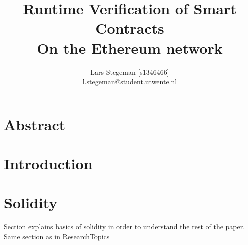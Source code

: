 \documentclass[a4paper]{article}
\title{Runtime Verification of Smart Contracts \\
\large On the Ethereum network \\}
\author{Lars Stegeman [s1346466]\\ l.stegeman@student.utwente.nl}
\begin{document}
\maketitle

\tableofcontents



\section{Abstract}

\section{Introduction}

\section{Solidity}
Section explains basics of solidity in order to understand the rest of the paper. Same section as in ResearchTopics
\end{document}
